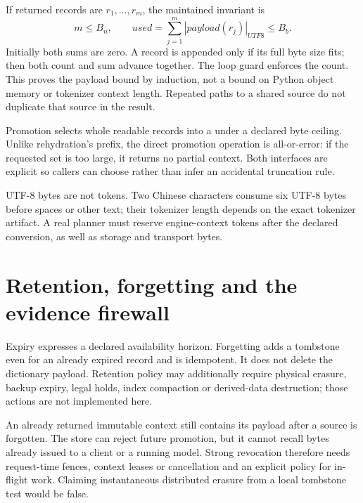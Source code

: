 If returned records are $r_1,\ldots,r_m$, the maintained invariant is
\[
 m\le B_n,\qquad used=\sum_{j=1}^m |payload(r_j)|_{UTF8}\le B_b.
\]
Initially both sums are zero. A record is appended only if its full byte size
fits; then both count and sum advance together. The loop guard enforces the
count. This proves the payload bound by induction, not a bound on Python
object memory or tokenizer context length. Repeated paths to a shared source
do not duplicate that source in the result.

Promotion selects whole readable records into a  under a
declared byte ceiling. Unlike rehydration's prefix, the direct promotion
operation is all-or-error: if the requested set is too large, it returns no
partial context. Both interfaces are explicit so callers can choose rather
than infer an accidental truncation rule.

UTF-8 bytes are not tokens. Two Chinese characters consume six UTF-8 bytes
before spaces or other text; their tokenizer length depends on the exact
tokenizer artifact. A real planner must reserve engine-context tokens after
the declared conversion, as well as storage and transport bytes.

\section{Retention, forgetting and the evidence firewall}
\label{evod40:firewall}
Expiry expresses a declared availability horizon. Forgetting adds a tombstone
even for an already expired record and is idempotent. It does not delete the
dictionary payload. Retention policy may additionally require physical erasure,
backup expiry, legal holds, index compaction or derived-data destruction;
those actions are not implemented here.

An already returned immutable context still contains its payload after a
source is forgotten. The store can reject future promotion, but it cannot
recall bytes already issued to a client or a running model. Strong revocation
therefore needs request-time fences, context leases or cancellation and an
explicit policy for in-flight work. Claiming instantaneous distributed erasure
from a local tombstone test would be false.

